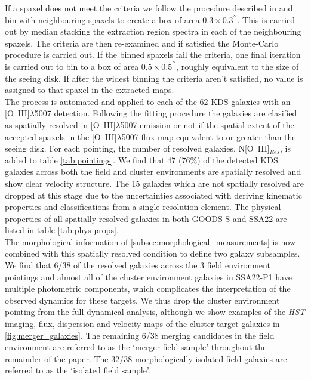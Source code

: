 \documentclass[fleqn,usenatbib]{mn2e}
\begin{document}
If a spaxel does not meet the criteria we follow the procedure described in \cite{Stott2016} and bin with neighbouring spaxels to create a box of area $0.3\times0.3^{\prime\prime}$.
This is carried out by median stacking the extraction region spectra in each of the neighbouring spaxels.
The criteria are then re-examined and if satisfied the Monte-Carlo procedure is carried out. 
If the binned spaxels fail the criteria, one final iteration is carried out to bin to a box of area $0.5\times0.5^{\prime\prime}$, roughly equivalent to the size of the seeing disk.
If after the widest binning the criteria aren't satisfied, no value is assigned to that spaxel in the extracted maps. \\

The process is automated and applied to each of the 62 KDS galaxies with an [O~{\sc III}]$\lambda$5007 detection.
Following the fitting procedure the galaxies are clasified as spatially resolved in [O~{\sc III}]$\lambda$5007 emission or not if the spatial extent of the accepted spaxels in the [O~{\sc III}]$\lambda$5007 flux map equivalent to or greater than the seeing disk.
For each pointing, the number of resolved galaxies, N[O~{\sc III}]$_{Res}$, is added to table \ref{tab:pointings}.
We find that 47 (76\%) of the detected KDS galaxies across both the field and cluster environments are spatially resolved and show clear velocity structure.
The 15 galaxies which are not spatially resolved are dropped at this stage due to the uncertainties associated with deriving kinematic properties and classifications from a single resolution element.
The physical properties of all spatially resolved galaxies in both GOODS-S and SSA22 are listed in table \ref{tab:phys-props}. \\ 

The morphological information of \cref{subsec:morphological_measurements} is now combined with this spatially resolved condition to define two galaxy subsamples.
We find that 6/38 of the resolved galaxies across the 3 field environment pointings and almost all of the cluster environment galaxies in SSA22-P1 have multiple photometric components, which complicates the interpretation of the observed dynamics for these targets.
We thus drop the cluster environment pointing from the full dynamical analysis, although we show examples of the {\em HST} imaging, flux, dispersion and velocity maps of the cluster target galaxies in \cref{fig:merger_galaxies}.
The remaining 6/38 merging candidates in the field environment are referred to as the `merger field sample' throughout the remainder of the paper.
The 32/38 morphologically isolated field galaxies are referred to as the `isolated field sample'.
\end{document}
